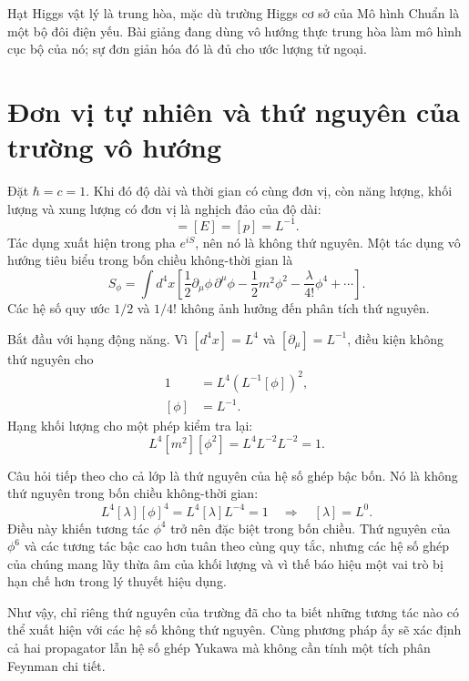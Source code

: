 Hạt Higgs vật lý là trung hòa, mặc dù trường Higgs cơ sở của Mô hình Chuẩn là một bộ đôi điện yếu. Bài giảng đang dùng vô hướng thực trung hòa làm mô hình cục bộ của nó; sự đơn giản hóa đó là đủ cho ước lượng tử ngoại.

\section{Đơn vị tự nhiên và thứ nguyên của trường vô hướng}

Đặt \(\hbar=c=1\). Khi đó độ dài và thời gian có cùng đơn vị, còn năng lượng, khối lượng và xung lượng có đơn vị là nghịch đảo của độ dài:
\begin{equation}
[m]=[E]=[p]=L^{-1}.
\end{equation}
Tác dụng xuất hiện trong pha \(e^{iS}\), nên nó là không thứ nguyên. Một tác dụng vô hướng tiêu biểu trong bốn chiều không-thời gian là
\begin{equation}
S_\phi=\int d^4x\left[
\frac12\partial_\mu\phi\,\partial^\mu\phi
-\frac12m^2\phi^2
-\frac{\lambda}{4!}\phi^4
+\cdots\right].
\end{equation}
Các hệ số quy ước \(1/2\) và \(1/4!\) không ảnh hưởng đến phân tích thứ nguyên.

Bắt đầu với hạng động năng. Vì \([d^4x]=L^4\) và \([\partial_\mu]=L^{-1}\), điều kiện không thứ nguyên cho
\begin{align}
1
&=L^4\left(L^{-1}[\phi]\right)^2,\\
[\phi]&=L^{-1}.
\end{align}
Hạng khối lượng cho một phép kiểm tra lại:
\begin{equation}
L^4[m^2][\phi^2]
=L^4L^{-2}L^{-2}=1.
\end{equation}

Câu hỏi tiếp theo cho cả lớp là thứ nguyên của hệ số ghép bậc bốn. Nó là không thứ nguyên trong bốn chiều không-thời gian:
\begin{equation}
L^4[\lambda][\phi]^4=L^4[\lambda]L^{-4}=1
\quad\Longrightarrow\quad [\lambda]=L^0.
\end{equation}
Điều này khiến tương tác \(\phi^4\) trở nên đặc biệt trong bốn chiều. Thứ nguyên của \(\phi^6\) và các tương tác bậc cao hơn tuân theo cùng quy tắc, nhưng các hệ số ghép của chúng mang lũy thừa âm của khối lượng và vì thế báo hiệu một vai trò bị hạn chế hơn trong lý thuyết hiệu dụng.

Như vậy, chỉ riêng thứ nguyên của trường đã cho ta biết những tương tác nào có thể xuất hiện với các hệ số không thứ nguyên. Cùng phương pháp ấy sẽ xác định cả hai propagator lẫn hệ số ghép Yukawa mà không cần tính một tích phân Feynman chi tiết.

